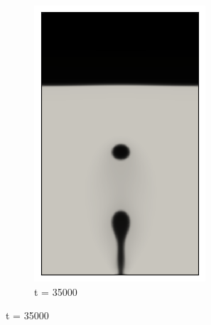 \begin{figure}[H]
\begin{subfigure}{0.25\textwidth}
		\includegraphics[width=\linewidth]{figs/cap4/cuda_bb_760_s35}
		\caption{t = 35000}
		\label{fig:6}
	\end{subfigure}
	

\end{figure}
